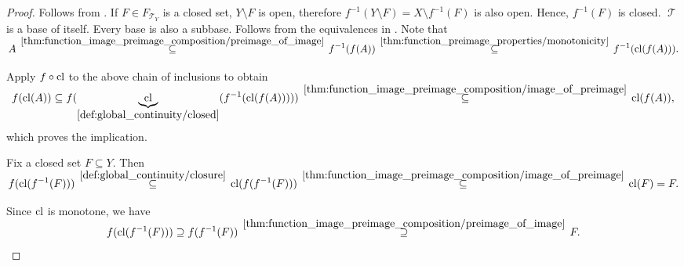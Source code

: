 \begin{proof}
   Follows from .
   If \( F \in F_{\mscrT_Y} \) is a closed set, \( Y \setminus F \) is open, therefore \( f^{-1}(Y \setminus F) = X \setminus f^{-1}(F) \) is also open. Hence, \( f^{-1}(F) \) is closed.
   \( \mscrT \) is a base of itself.
   Every base is also a subbase.
   Follows from the equivalences in .
   Note that
  \begin{equation*}
    A
    \reloset {\ref{thm:function_image_preimage_composition/preimage_of_image}} \subseteq
    f^{-1}(f(A))
    \reloset {\ref{thm:function_preimage_properties/monotonicity}} \subseteq
    f^{-1}(\cl(f(A))).
  \end{equation*}

  Apply \( f \circ \operatorname{cl} \) to the above chain of inclusions to obtain
  \begin{equation*}
    f(\cl(A))
    \subseteq
    f(\underbrace{\cl}_{\ref{def:global_continuity/closed}}(f^{-1}(\cl(f(A)))))
    \reloset {\ref{thm:function_image_preimage_composition/image_of_preimage}} \subseteq
    \cl(f(A)),
  \end{equation*}
  which proves the implication.

   Fix a closed set \( F \subseteq Y \). Then
  \begin{equation}\label{def:global_continuity/closure_implies_closed_right}
    f(\cl(f^{-1}(F)))
    \reloset {\ref{def:global_continuity/closure}} \subseteq
    \cl(f(f^{-1}(F)))
    \reloset {\ref{thm:function_image_preimage_composition/image_of_preimage}} \subseteq
    \cl(F)
    =
    F.
  \end{equation}

  Since \( \operatorname{cl} \) is monotone, we have
  \begin{equation}\label{def:global_continuity/closure_implies_closed_left}
    f(\cl(f^{-1}(F)))
    \supseteq
    f(f^{-1}(F))
    \reloset {\ref{thm:function_image_preimage_composition/preimage_of_image}} \supseteq
    F.
  \end{equation}


\end{proof}
